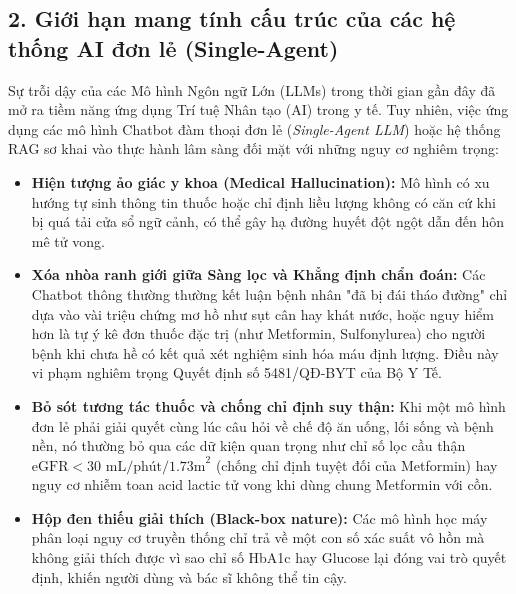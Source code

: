 \documentclass[12pt,a4paper]{article}
\begin{document}
\subsection*{2. Giới hạn mang tính cấu trúc của các hệ thống AI đơn lẻ (Single-Agent)}
Sự trỗi dậy của các Mô hình Ngôn ngữ Lớn (LLMs) trong thời gian gần đây đã mở ra tiềm năng ứng dụng Trí tuệ Nhân tạo (AI) trong y tế. Tuy nhiên, việc ứng dụng các mô hình Chatbot đàm thoại đơn lẻ (\textit{Single-Agent LLM}) hoặc hệ thống RAG sơ khai vào thực hành lâm sàng đối mặt với những nguy cơ nghiêm trọng:
\begin{itemize}[leftmargin=1.2cm]
    \item \textbf{Hiện tượng ảo giác y khoa (Medical Hallucination):} Mô hình có xu hướng tự sinh thông tin thuốc hoặc chỉ định liều lượng không có căn cứ khi bị quá tải cửa sổ ngữ cảnh, có thể gây hạ đường huyết đột ngột dẫn đến hôn mê tử vong.
    \item \textbf{Xóa nhòa ranh giới giữa Sàng lọc và Khẳng định chẩn đoán:} Các Chatbot thông thường thường kết luận bệnh nhân "đã bị đái tháo đường" chỉ dựa vào vài triệu chứng mơ hồ như sụt cân hay khát nước, hoặc nguy hiểm hơn là tự ý kê đơn thuốc đặc trị (như Metformin, Sulfonylurea) cho người bệnh khi chưa hề có kết quả xét nghiệm sinh hóa máu định lượng. Điều này vi phạm nghiêm trọng Quyết định số 5481/QĐ-BYT của Bộ Y Tế.
    \item \textbf{Bỏ sót tương tác thuốc và chống chỉ định suy thận:} Khi một mô hình đơn lẻ phải giải quyết cùng lúc câu hỏi về chế độ ăn uống, lối sống và bệnh nền, nó thường bỏ qua các dữ kiện quan trọng như chỉ số lọc cầu thận $\text{eGFR} < 30\text{ mL/phút/1.73m}^2$ (chống chỉ định tuyệt đối của Metformin) hay nguy cơ nhiễm toan acid lactic tử vong khi dùng chung Metformin với cồn.
    \item \textbf{Hộp đen thiếu giải thích (Black-box nature):} Các mô hình học máy phân loại nguy cơ truyền thống chỉ trả về một con số xác suất vô hồn mà không giải thích được vì sao chỉ số HbA1c hay Glucose lại đóng vai trò quyết định, khiến người dùng và bác sĩ không thể tin cậy.
\end{itemize}
\end{document}

